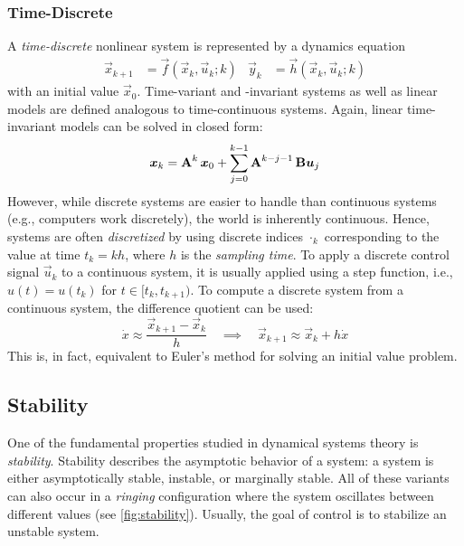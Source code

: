 			\subsubsection{Time-Discrete}
				A \emph{time-discrete} nonlinear system is represented by a dynamics equation
				\begin{align}
					\vec{x}_{k + 1} & = \vec{f}(\vec{x}_k, \vec{u}_k; k) &
					\vec{y}_k       & = \vec{h}(\vec{x}_k, \vec{u}_k; k)
				\end{align}
				with an initial value \(\vec{x}_0\). Time-variant and -invariant systems as well as linear models are defined analogous to time-continuous systems. Again, linear time-invariant models can be solved in closed form:
				\begin{equation}
					\bm{x}_k = \bm{\mathrm{A}}^k\, \bm{x}_0 + \sum_{j = 0}^{k - 1} \bm{\mathrm{A}}^{k - j - 1}\, \bm{\mathrm{B}} \bm{u}_j  \label{eqn:discreteClosedForm}
				\end{equation}
				However, while discrete systems are easier to handle than continuous systems (e.g., computers work discretely), the world is inherently continuous. Hence, systems are often \emph{discretized} by using discrete indices \(\cdot_k\) corresponding to the value at time \(t_k = k h\), where \(h\) is the \emph{sampling time}. To apply a discrete control signal \( \vec{u}_k \) to a continuous system, it is usually applied using a step function, i.e., \( u(t) = u(t_k) \) for \( t \in [t_k, t_{k + 1}) \). To compute a discrete system from a continuous system, the difference quotient can be used:
				\begin{equation}
					\dot{x} \approx \frac{\vec{x}_{k + 1} - \vec{x}_k}{h}
					\quad\implies\quad
					\vec{x}_{k + 1} \approx \vec{x}_k + h \dot{x}
				\end{equation}
				This is, in fact, equivalent to Euler's method for solving an initial value problem.

		\subsection{Stability} %
			One of the fundamental properties studied in dynamical systems theory is \emph{stability}. Stability describes the asymptotic behavior of a system: a system is either asymptotically stable, instable, or marginally stable. All of these variants can also occur in a \emph{ringing} configuration where the system oscillates between different values (see \autoref{fig:stability}). Usually, the goal of control is to stabilize an unstable system.

